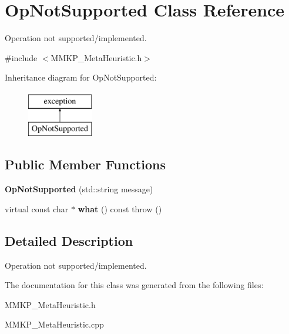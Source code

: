 \hypertarget{class_op_not_supported}{\section{Op\+Not\+Supported Class Reference}
\label{class_op_not_supported}
}


Operation not supported/implemented.  




{\ttfamily \#include $<$M\+M\+K\+P\+\_\+\+Meta\+Heuristic.\+h$>$}

Inheritance diagram for Op\+Not\+Supported\+:\begin{figure}[H]
\begin{center}
\leavevmode
\includegraphics[height=2.000000cm]{class_op_not_supported}
\end{center}
\end{figure}
\subsection*{Public Member Functions}
\begin{DoxyCompactItemize}
\item 
\hypertarget{class_op_not_supported_ae538c9ab4dfbb4f82db960de61cb7458}{{\bfseries Op\+Not\+Supported} (std\+::string message)}\label{class_op_not_supported_ae538c9ab4dfbb4f82db960de61cb7458}

\item 
\hypertarget{class_op_not_supported_a2fea1b12d8fee8e97ee2c428cd62d7e0}{virtual const char $\ast$ {\bfseries what} () const   throw ()}\label{class_op_not_supported_a2fea1b12d8fee8e97ee2c428cd62d7e0}

\end{DoxyCompactItemize}


\subsection{Detailed Description}
Operation not supported/implemented. 

The documentation for this class was generated from the following files\+:\begin{DoxyCompactItemize}
\item 
M\+M\+K\+P\+\_\+\+Meta\+Heuristic.\+h\item 
M\+M\+K\+P\+\_\+\+Meta\+Heuristic.\+cpp\end{DoxyCompactItemize}
